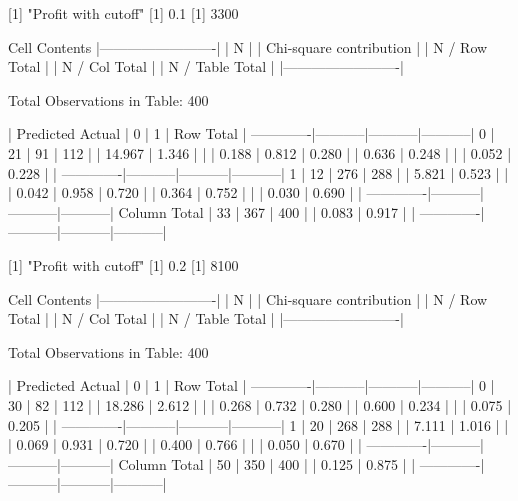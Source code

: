 \documentclass{article}
\begin{document}
\begin{Schunk}
\begin{Soutput}
 
[1] "Profit with cutoff"
[1] 0.1
[1] 3300

 
   Cell Contents
|-------------------------|
|                       N |
| Chi-square contribution |
|           N / Row Total |
|           N / Col Total |
|         N / Table Total |
|-------------------------|

 
Total Observations in Table:  400 

 
             | Predicted 
      Actual |         0 |         1 | Row Total | 
-------------|-----------|-----------|-----------|
           0 |        21 |        91 |       112 | 
             |    14.967 |     1.346 |           | 
             |     0.188 |     0.812 |     0.280 | 
             |     0.636 |     0.248 |           | 
             |     0.052 |     0.228 |           | 
-------------|-----------|-----------|-----------|
           1 |        12 |       276 |       288 | 
             |     5.821 |     0.523 |           | 
             |     0.042 |     0.958 |     0.720 | 
             |     0.364 |     0.752 |           | 
             |     0.030 |     0.690 |           | 
-------------|-----------|-----------|-----------|
Column Total |        33 |       367 |       400 | 
             |     0.083 |     0.917 |           | 
-------------|-----------|-----------|-----------|

 
[1] "Profit with cutoff"
[1] 0.2
[1] 8100

 
   Cell Contents
|-------------------------|
|                       N |
| Chi-square contribution |
|           N / Row Total |
|           N / Col Total |
|         N / Table Total |
|-------------------------|

 
Total Observations in Table:  400 

 
             | Predicted 
      Actual |         0 |         1 | Row Total | 
-------------|-----------|-----------|-----------|
           0 |        30 |        82 |       112 | 
             |    18.286 |     2.612 |           | 
             |     0.268 |     0.732 |     0.280 | 
             |     0.600 |     0.234 |           | 
             |     0.075 |     0.205 |           | 
-------------|-----------|-----------|-----------|
           1 |        20 |       268 |       288 | 
             |     7.111 |     1.016 |           | 
             |     0.069 |     0.931 |     0.720 | 
             |     0.400 |     0.766 |           | 
             |     0.050 |     0.670 |           | 
-------------|-----------|-----------|-----------|
Column Total |        50 |       350 |       400 | 
             |     0.125 |     0.875 |           | 
-------------|-----------|-----------|-----------|


\end{Soutput}
\end{Schunk}
\end{document}
